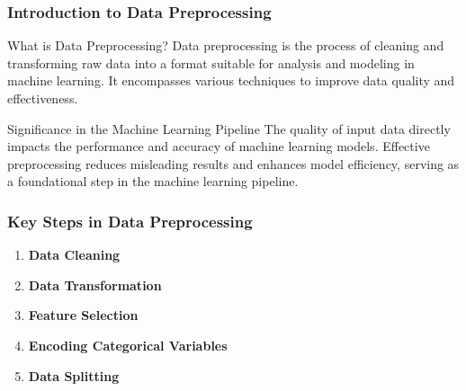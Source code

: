 \documentclass[aspectratio=169]{beamer}
\begin{document}
\frame{\titlepage}

\begin{frame}[fragile]
    \frametitle{Introduction to Data Preprocessing}
    \begin{block}{What is Data Preprocessing?}
        Data preprocessing is the process of cleaning and transforming raw data into a format suitable for analysis and modeling in machine learning. It encompasses various techniques to improve data quality and effectiveness.
    \end{block}
    \begin{block}{Significance in the Machine Learning Pipeline}
        The quality of input data directly impacts the performance and accuracy of machine learning models. Effective preprocessing reduces misleading results and enhances model efficiency, serving as a foundational step in the machine learning pipeline.
    \end{block}
\end{frame}

\begin{frame}[fragile]
    \frametitle{Key Steps in Data Preprocessing}
    \begin{enumerate}
        \item \textbf{Data Cleaning}
        \item \textbf{Data Transformation}
        \item \textbf{Feature Selection}
        \item \textbf{Encoding Categorical Variables}
        \item \textbf{Data Splitting}
    \end{enumerate}
\end{frame}
\end{document}
